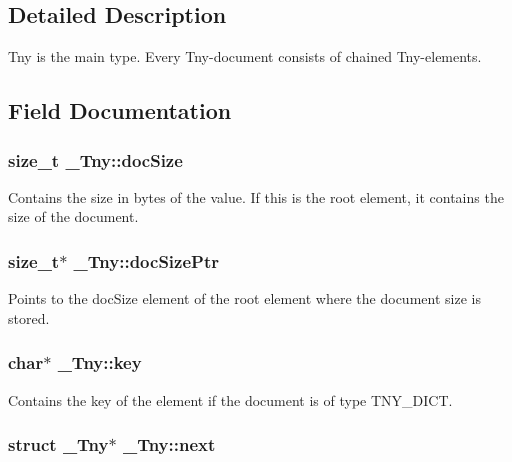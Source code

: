 \subsection{\-Detailed \-Description}
\-Tny is the main type. \-Every \-Tny-\/document consists of chained \-Tny-\/elements. 

\subsection{\-Field \-Documentation}
\hypertarget{struct__Tny_ab23a0bb54191a8d5e38c6984da5c4c40}{
\subsubsection[{doc\-Size}]{\setlength{\rightskip}{0pt plus 5cm}size\-\_\-t {\bf \-\_\-\-Tny\-::doc\-Size}}}\label{struct__Tny_ab23a0bb54191a8d5e38c6984da5c4c40}
\-Contains the size in bytes of the value. \-If this is the root element, it contains the size of the document. \hypertarget{struct__Tny_aa8a5f464cc9674c61c82d500772a7b3b}{
\subsubsection[{doc\-Size\-Ptr}]{\setlength{\rightskip}{0pt plus 5cm}size\-\_\-t$\ast$ {\bf \-\_\-\-Tny\-::doc\-Size\-Ptr}}}\label{struct__Tny_aa8a5f464cc9674c61c82d500772a7b3b}
\-Points to the doc\-Size element of the root element where the document size is stored. \hypertarget{struct__Tny_abaa74403ca9f15a07d3532e116b50550}{
\subsubsection[{key}]{\setlength{\rightskip}{0pt plus 5cm}char$\ast$ {\bf \-\_\-\-Tny\-::key}}}\label{struct__Tny_abaa74403ca9f15a07d3532e116b50550}
\-Contains the key of the element if the document is of type \-T\-N\-Y\-\_\-\-D\-I\-C\-T. \hypertarget{struct__Tny_afc48d7b4e60d6526269070165ec94169}{
\subsubsection[{next}]{\setlength{\rightskip}{0pt plus 5cm}struct {\bf \-\_\-\-Tny}$\ast$ {\bf \-\_\-\-Tny\-::next}}}\label{struct__Tny_afc48d7b4e60d6526269070165ec94169}

